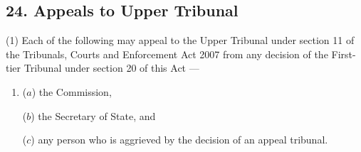 \documentclass[12pt,a4paper]{article}
\begin{document}
\subsection{24. Appeals to Upper Tribunal}  %


(1) Each of the following may appeal 
to the Upper Tribunal under section 11 of the Tribunals, Courts and Enforcement Act 2007 from any decision of the First-tier Tribunal under section 20 of this Act%
—
\begin{enumerate}\item[]
($a$) the Commission,

($b$) the Secretary of State, and

($c$) any person who is aggrieved by the decision of an appeal tribunal.
\end{enumerate}

\end{document}

